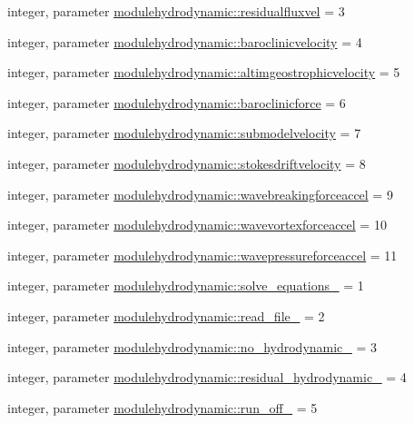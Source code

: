 \begin{DoxyCompactItemize}
\item 
integer, parameter \mbox{\hyperlink{namespacemodulehydrodynamic_abf8de9c99f5fa9bed67982723ae76bcb}{modulehydrodynamic\+::residualfluxvel}} = 3
\item 
integer, parameter \mbox{\hyperlink{namespacemodulehydrodynamic_a6dff582748a31326ff3452989be5d686}{modulehydrodynamic\+::baroclinicvelocity}} = 4
\item 
integer, parameter \mbox{\hyperlink{namespacemodulehydrodynamic_aaf56db5dff4032bdc271e9661a1e7286}{modulehydrodynamic\+::altimgeostrophicvelocity}} = 5
\item 
integer, parameter \mbox{\hyperlink{namespacemodulehydrodynamic_afca6e46bfa2d959d2be36aa37504de07}{modulehydrodynamic\+::baroclinicforce}} = 6
\item 
integer, parameter \mbox{\hyperlink{namespacemodulehydrodynamic_ae4ed7c2aa878fe8600f68206a805e046}{modulehydrodynamic\+::submodelvelocity}} = 7
\item 
integer, parameter \mbox{\hyperlink{namespacemodulehydrodynamic_ae80a767c90ef42046d7d809b02831b3f}{modulehydrodynamic\+::stokesdriftvelocity}} = 8
\item 
integer, parameter \mbox{\hyperlink{namespacemodulehydrodynamic_a85d4e406fa8803b563f2e18473cffd63}{modulehydrodynamic\+::wavebreakingforceaccel}} = 9
\item 
integer, parameter \mbox{\hyperlink{namespacemodulehydrodynamic_a828e8991e1580c3cfdd50607a446fbd8}{modulehydrodynamic\+::wavevortexforceaccel}} = 10
\item 
integer, parameter \mbox{\hyperlink{namespacemodulehydrodynamic_a3847705bc2f5eff4713dd7d73b599b05}{modulehydrodynamic\+::wavepressureforceaccel}} = 11
\item 
integer, parameter \mbox{\hyperlink{namespacemodulehydrodynamic_a47408b2c066e95c9620e69f86d5938a6}{modulehydrodynamic\+::solve\+\_\+equations\+\_\+}} = 1
\item 
integer, parameter \mbox{\hyperlink{namespacemodulehydrodynamic_a25731915f5b023304f88829f36638ad6}{modulehydrodynamic\+::read\+\_\+file\+\_\+}} = 2
\item 
integer, parameter \mbox{\hyperlink{namespacemodulehydrodynamic_a3e95504ebcd5b1792533b2e3618b9771}{modulehydrodynamic\+::no\+\_\+hydrodynamic\+\_\+}} = 3
\item 
integer, parameter \mbox{\hyperlink{namespacemodulehydrodynamic_a01c55cb119451119e83b9ae24741b1b5}{modulehydrodynamic\+::residual\+\_\+hydrodynamic\+\_\+}} = 4
\item 
integer, parameter \mbox{\hyperlink{namespacemodulehydrodynamic_a2d9fe7271d7e4f545caa134ac3a37400}{modulehydrodynamic\+::run\+\_\+off\+\_\+}} = 5

\end{DoxyCompactItemize}

